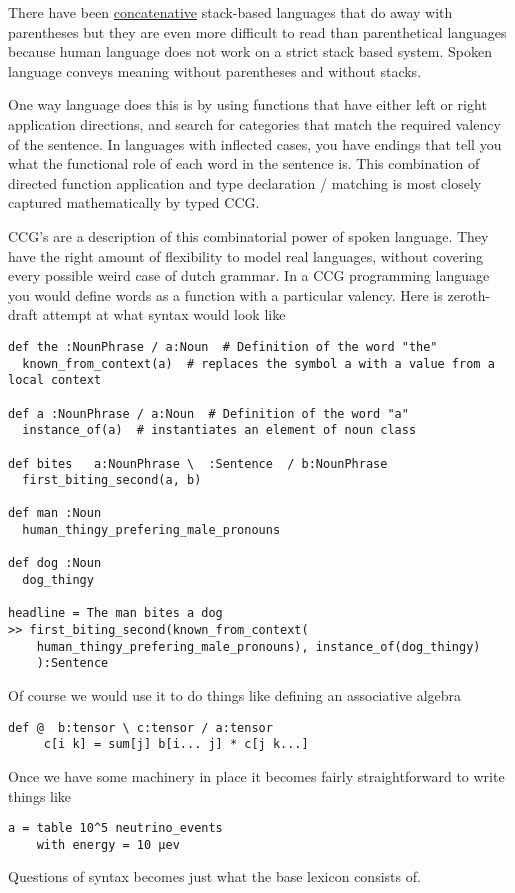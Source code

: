 \documentclass[onecolumn,10pt]{article}
\begin{document}
There have been \href{https://en.wikipedia.org/wiki/Concatenative_programming_language}{concatenative} stack-based languages that do away with parentheses but they are even more difficult to read than parenthetical languages because human language does not work on a strict stack based system.
Spoken language conveys meaning without parentheses and without stacks.

One way language does this is by using functions that have either left or right application directions, and search for categories that match the required valency of the sentence. In languages with inflected cases, you have endings that tell you what the functional role of each word in the sentence is. This combination of directed function application and type declaration / matching is most closely captured mathematically by typed CCG.

CCG's are a description of this combinatorial power of spoken language.  They have the right amount of flexibility to model real languages, without covering every possible weird case of dutch grammar. In a CCG programming language you would define words as a function with a particular valency. Here is zeroth-draft attempt at what syntax would look like

\begin{verbatim}
def the :NounPhrase / a:Noun  # Definition of the word "the"
  known_from_context(a)  # replaces the symbol a with a value from a local context

def a :NounPhrase / a:Noun  # Definition of the word "a"
  instance_of(a)  # instantiates an element of noun class

def bites   a:NounPhrase \  :Sentence  / b:NounPhrase 
  first_biting_second(a, b)
	
def man :Noun
  human_thingy_prefering_male_pronouns
	
def dog :Noun
  dog_thingy

headline = The man bites a dog
>> first_biting_second(known_from_context(
	human_thingy_prefering_male_pronouns), instance_of(dog_thingy) 
	):Sentence
\end{verbatim}

Of course we would use it to do things like defining an associative algebra

\begin{verbatim}
def @  b:tensor \ c:tensor / a:tensor 
	 c[i k] = sum[j] b[i... j] * c[j k...]
\end{verbatim}

Once we have some machinery in place it becomes fairly straightforward to write things like 
\begin{verbatim}
a = table 10^5 neutrino_events 
	with energy = 10 μev
\end{verbatim}
Questions of syntax becomes just what the base lexicon consists of.
\end{document}

